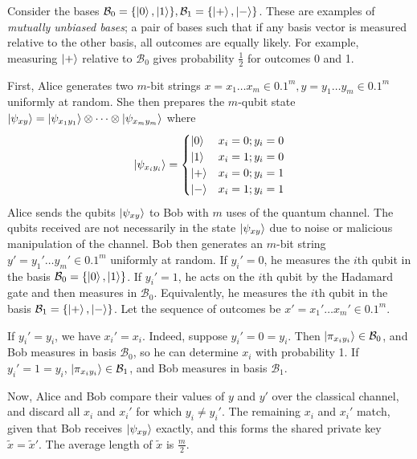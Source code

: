 Consider the bases \( \mathcal B_0 = \qty{\ket{0}, \ket{1}}, \mathcal B_1 = \qty{\ket{+}, \ket{-}} \).
These are examples of \emph{mutually unbiased bases}; a pair of bases such that if any basis vector is measured relative to the other basis, all outcomes are equally likely.
For example, measuring \( \ket{+} \) relative to \( \mathcal B_0 \) gives probability \( \frac{1}{2} \) for outcomes 0 and 1.

First, Alice generates two \( m \)-bit strings \( x = x_1 \dots x_m \in \qty{0,1}^m, y = y_1 \dots y_m \in \qty{0,1}^m \) uniformly at random.
She then prepares the \( m \)-qubit state \( \ket{\psi_{xy}} = \ket{\psi_{x_1 y_1}} \otimes \dots \otimes \ket{\psi_{x_m y_m}} \) where
\[ \ket{\psi_{x_i y_i}} = \begin{cases}
    \ket{0} & x_i = 0; y_i = 0 \\
    \ket{1} & x_i = 1; y_i = 0 \\
    \ket{+} & x_i = 0; y_i = 1 \\
    \ket{-} & x_i = 1; y_i = 1
\end{cases} \]
Alice sends the qubits \( \ket{\psi_{xy}} \) to Bob with \( m \) uses of the quantum channel.
The qubits received are not necessarily in the state \( \ket{\psi_{xy}} \) due to noise or malicious manipulation of the channel.
Bob then generates an \( m \)-bit string \( y' = y_1' \dots y_m' \in \qty{0,1}^m \) uniformly at random.
If \( y_i' = 0 \), he measures the \( i \)th qubit in the basis \( \mathcal B_0 = \qty{\ket{0}, \ket{1}} \).
If \( y_i' = 1 \), he acts on the \( i \)th qubit by the Hadamard gate and then measures in \( \mathcal B_0 \).
Equivalently, he measures the \( i \)th qubit in the basis \( \mathcal B_1 = \qty{\ket{+}, \ket{-}} \).
Let the sequence of outcomes be \( x' = x_1' \dots x_m' \in \qty{0,1}^m \).

If \( y_i' = y_i \), we have \( x_i' = x_i \).
Indeed, suppose \( y_i' = 0 = y_i \).
Then \( \ket{\pi_{x_i y_i}} \in \mathcal B_0 \), and Bob measures in basis \( \mathcal B_0 \), so he can determine \( x_i \) with probability 1.
If \( y_i' = 1 = y_i \), \( \ket{\pi_{x_i y_i}} \in \mathcal B_1 \), and Bob measures in basis \( \mathcal B_1 \).

Now, Alice and Bob compare their values of \( y \) and \( y' \) over the classical channel, and discard all \( x_i \) and \( x_i' \) for which \( y_i \neq y_i' \).
The remaining \( x_i \) and \( x_i' \) match, given that Bob receives \( \ket{\psi_{xy}} \) exactly, and this forms the shared private key \( \widetilde x = \widetilde x' \).
The average length of \( \widetilde x \) is \( \frac{m}{2} \).

